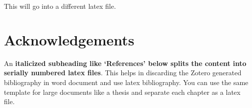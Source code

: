 
This will go into a different latex file. 



\section{\texorpdfstring{\textbf{Acknowledgements}}{Acknowledgements}} 


An \textbf{italicized subheading like `References' below splits the content into serially numbered latex files}. This helps in discarding the Zotero generated bibliography in word document and use latex bibliography. You can use the same template for large documents like a thesis and separate each chapter as a latex file. 



